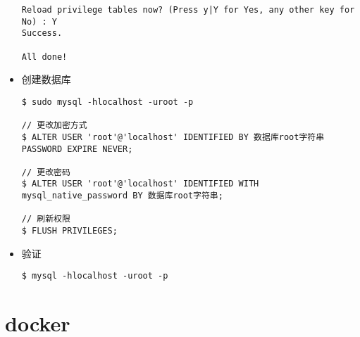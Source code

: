 \begin{itemize}
\begin{lstlisting}
Reload privilege tables now? (Press y|Y for Yes, any other key for No) : Y
Success.

All done! 
\end{lstlisting}

\item 创建数据库
\begin{lstlisting}
$ sudo mysql -hlocalhost -uroot -p

// 更改加密方式
$ ALTER USER 'root'@'localhost' IDENTIFIED BY 数据库root字符串 PASSWORD EXPIRE NEVER;

// 更改密码
$ ALTER USER 'root'@'localhost' IDENTIFIED WITH mysql_native_password BY 数据库root字符串;

// 刷新权限
$ FLUSH PRIVILEGES;
\end{lstlisting}

\item 验证
\begin{lstlisting}
$ mysql -hlocalhost -uroot -p
\end{lstlisting}
\end{itemize}


\section{docker}

